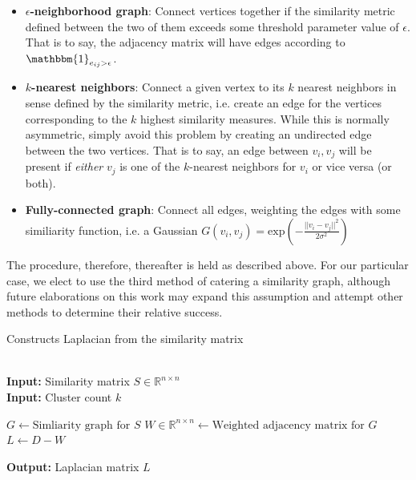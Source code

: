 \documentclass{article}
\begin{document}
\begin{itemize}
    \item \textbf{$\epsilon$-neighborhood graph}: Connect vertices together if the similarity metric defined between the two of them exceeds some threshold parameter value of $\epsilon$. That is to say, the adjacency matrix will have edges according to $\mathbbm{1}_{e_{ij}>\epsilon}$.
    \item \textbf{$k$-nearest neighbors}: Connect a given vertex to its $k$ nearest neighbors in sense defined by the similarity metric, i.e. create an edge for the vertices corresponding to the $k$ highest similarity measures. While this is normally asymmetric, simply avoid this problem by creating an undirected edge between the two vertices. That is to say, an edge between $v_i,v_j$ will be present if \textit{either} $v_j$ is one of the $k$-nearest neighbors for $v_i$ or vice versa (or both).
    \item \textbf{Fully-connected graph}: Connect all edges, weighting the edges with some similiarity function, i.e. a Gaussian $G(v_i,v_j) = \text{exp}\left(-\frac{|| v_i - v_j ||^2}{2\sigma^2}\right)$
\end{itemize}

The procedure, therefore, thereafter is held as described above. For our particular case, we elect to use the third method of catering a similarity graph, although future elaborations on this work may expand this assumption and attempt other methods to determine their relative success. 

\begin{algorithm}
    
\caption{Constructs Laplacian from the similarity matrix}\label{alg:laplacian}
\begin{algorithmic}[1]
 \\
\textbf{Input:} Similarity matrix $S\in\mathbb{R}^{n\times n}$ \\
\textbf{Input:} Cluster count $k$

\State $G \gets \text{Simliarity graph for } S$
\State $W\in\mathbb{R}^{n\times n} \gets \text{Weighted adjacency matrix for } G$
\State $L \gets D - W$

\textbf{Output:} Laplacian matrix $L$
\EndProcedure
\end{algorithmic}
\end{algorithm}
\end{document}
